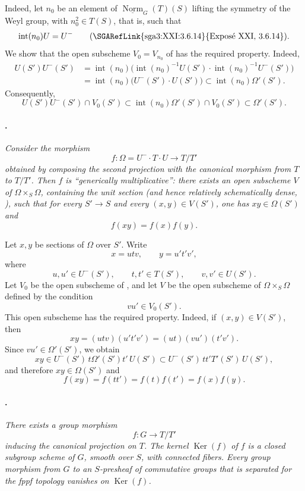 Indeed, let \(n_0\) be an element of
\(\underline{\operatorname{Norm}}_G(T)(S)\) lifting the symmetry of
the Weyl group, with \(n_0^2\in T(S)\), that is, such that
\[
  \operatorname{int}(n_0)U=U^-
  \qquad\text{\textup{(\SGARefLink{sga3:XXI:3.6.14}{Exposé XXI, 3.6.14})}}.
\]
We show that the open subscheme
\(V_0=V_{n_0}\) of  has the required property. Indeed,
\[
\begin{aligned}
  U(S')U^-(S')
  &=
  \operatorname{int}(n_0)
  \bigl(
    \operatorname{int}(n_0)^{-1}U(S')
    \cdot\operatorname{int}(n_0)^{-1}U^-(S')
  \bigr)\\
  &=
  \operatorname{int}(n_0)\bigl(U^-(S')\cdot U(S')\bigr)
  \subset\operatorname{int}(n_0)\Omega'(S').
\end{aligned}
\]
Consequently,
\[
  U(S')U^-(S')\cap V_0(S')
  \subset
  \operatorname{int}(n_0)\Omega'(S')\cap V_0(S')
  \subset\Omega'(S').
\]

\paragraph{.}
{\itshape Consider the morphism
\[
  f:\Omega=U^-\cdot T\cdot U\longrightarrow T/T'
\]
obtained by composing the second projection with the canonical
morphism from \(T\) to \(T/T'\). Then \(f\) is
``generically multiplicative'': there exists an open subscheme
\(V\) of \(\Omega\times_S\Omega\), containing the unit section
\textup{(and hence relatively schematically dense,
)}, such that for every \(S'\to S\) and every
\((x,y)\in V(S')\), one has \(xy\in\Omega(S')\) and
\[
  f(xy)=f(x)f(y).
\]}

Let \(x,y\) be sections of \(\Omega\) over \(S'\). Write
\[
  x=utv,\qquad y=u't'v',
\]
where
\[
  u,u'\in U^-(S'),\qquad t,t'\in T(S'),\qquad v,v'\in U(S').
\]
Let \(V_0\) be the open subscheme of , and let \(V\) be the
open subscheme of \(\Omega\times_S\Omega\) defined by the condition
\[
  vu'\in V_0(S').
\]
This open subscheme has the required property. Indeed, if
\((x,y)\in V(S')\), then
\[
  xy=(utv)(u't'v')=(ut)(vu')(t'v').
\]
Since \(vu'\in\Omega'(S')\), we obtain
\[
  xy
  \in U^-(S')\,t\Omega'(S')t'\,U(S')
  \subset U^-(S')\,tt'T'(S')\,U(S'),
\]
and therefore \(xy\in\Omega(S')\) and
\[
  f(xy)=f(tt')=f(t)f(t')=f(x)f(y).
\]

\paragraph{.}
\textit{There exists a group morphism}
\[
  f:G\longrightarrow T/T'
\]
\textit{inducing the canonical projection on \(T\). The kernel
\(\operatorname{Ker}(f)\) of \(f\) is a closed subgroup scheme of
\(G\), smooth over \(S\), with connected fibers. Every group
morphism from \(G\) to an \(S\)-presheaf of commutative groups
that is separated for the fppf topology vanishes on
\(\operatorname{Ker}(f)\).}

